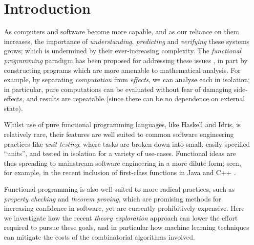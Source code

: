 \section{Introduction}

\iffalse
TODO
Intro + motivation

About 2 pages

Haskell is a mainstream FP language (motivation)

QuickCheck (example)

How to come up with the properties

Mention theory exploration
\fi

As computers and software become more capable, and as our reliance on them increases, the importance of \emph{understanding}, \emph{predicting} and \emph{verifying} these systems grows; which is undermined by their ever-increasing complexity. The \emph{functional programming} paradigm has been proposed for addressing these issues \cite{hughes1989functional}, in part by constructing programs which are more amenable to mathematical analysis. For example, by separating \emph{computation} from \emph{effects}, we can analyse each in isolation; in particular, pure computations can be evaluated without fear of damaging side-effects, and results are repeatable (since there can be no dependence on external state).

Whilst use of pure functional programming languages, like Haskell and Idris, is relatively rare, their features are well suited to common software engineering practices like \emph{unit testing}; where tasks are broken down into small, easily-specified ``units'', and tested in isolation for a variety of use-cases. Functional ideas are thus spreading to mainstream software engineering in a more dilute form; seen, for example, in the recent inclusion of first-class functions in Java \cite{gosling2015java} and C++ \cite{willcock2006lambda}.

Functional programming is also well suited to more radical practices, such as \emph{property checking} and \emph{theorem proving}, which are promising methods for increasing confidence in software, yet are currently prohibitively expensive. Here we investigate how the recent \emph{theory exploration} approach can lower the effort required to pursue these goals, and in particular how machine learning techniques can mitigate the costs of the combinatorial algorithms involved.

\iffalse
TODO
Our contributions are:

\begin{itemize}
  \item A framework for applying theory exploration tools such as \qspec{} to Haskell's existing package system.
  \item A
\end{itemize}
\fi

